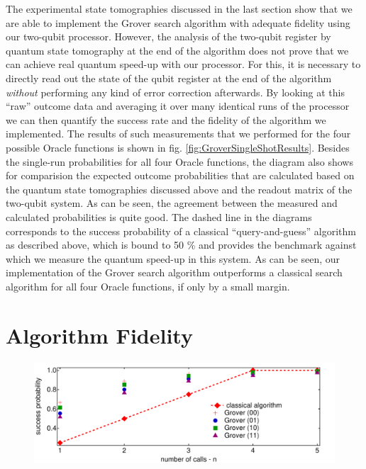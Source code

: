 The experimental state tomographies discussed in the last section show that we are able to implement the Grover search algorithm with adequate fidelity using our two-qubit processor. However, the analysis of the two-qubit register by quantum state tomography at the end of the algorithm does not prove that we can achieve real quantum speed-up with our processor. For this, it is necessary to directly read out the state of the qubit register at the end of the algorithm {\it without} performing any kind of error correction afterwards. By looking at this ``raw'' outcome data and averaging it over many identical runs of the processor we can then quantify the success rate and the fidelity of the algorithm we implemented. The results of such measurements that we performed for the four possible Oracle functions is shown in fig. \ref{fig:GroverSingleShotResults}. Besides the single-run probabilities for all four Oracle functions, the diagram also shows for comparision the expected outcome probabilities that are calculated based on the quantum state tomographies discussed above and the readout matrix of the two-qubit system. As can be seen, the agreement between the measured and calculated probabilities is quite good. The dashed line in the diagrams corresponds to the success probability of a classical ``query-and-guess'' algorithm as described above, which is bound to 50 \% and provides the benchmark against which we measure the quantum speed-up in this system. As can be seen, our implementation of the Grover search algorithm outperforms a classical search algorithm for all four Oracle functions, if only by a small margin.

\section{Algorithm Fidelity}

\begin{figure}[ht!]
	\centering
	\includegraphics[width=1\textwidth]{"./material/mathematica/comparision_grover_classical"}
	\caption[]{}
	\label{fig:comparision_grover_classical}
\end{figure}

